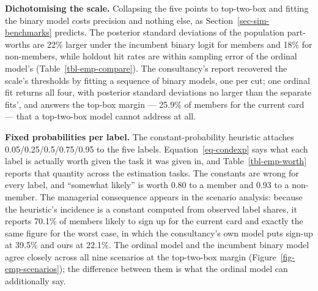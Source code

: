 \documentclass[
  letterpaper,
  DIV=11,
  numbers=noendperiod]{scrartcl}
\theoremstyle{plain}
\theoremstyle{plain}
\theoremstyle{plain}
\theoremstyle{remark}
\begin{document}
\textbf{Dichotomising the scale.} Collapsing the five points to
top-two-box and fitting the binary model costs precision and nothing
else, as Section~\ref{sec-sim-benchmarks} predicts. The posterior
standard deviations of the population part-worths are 22\% larger under
the incumbent binary logit for members and 18\% for non-members, while
holdout hit rates are within sampling error of the ordinal model's
(Table~\ref{tbl-emp-compare}). The consultancy's report recovered the
scale's thresholds by fitting a sequence of binary models, one per cut;
one ordinal fit returns all four, with posterior standard deviations no
larger than the separate fits', and answers the top-box margin ---
25.9\% of members for the current card --- that a top-two-box model
cannot address at all.

\textbf{Fixed probabilities per label.} The constant-probability
heuristic attaches 0.05/0.25/0.5/0.75/0.95 to the five labels.
Equation~\ref{eq-condexp} says what each label is actually worth given
the task it was given in, and Table~\ref{tbl-emp-worth} reports that
quantity across the estimation tasks. The constants are wrong for every
label, and ``somewhat likely'' is worth 0.80 to a member and 0.93 to a
non-member. The managerial consequence appears in the scenario analysis:
because the heuristic's incidence is a constant computed from observed
label shares, it reports 70.1\% of members likely to sign up for the
current card and exactly the same figure for the worst case, in which
the consultancy's own model puts sign-up at 39.5\% and ours at 22.1\%.
The ordinal model and the incumbent binary model agree closely across
all nine scenarios at the top-two-box margin
(Figure~\ref{fig-emp-scenarios}); the difference between them is what
the ordinal model can additionally say.
\end{document}
